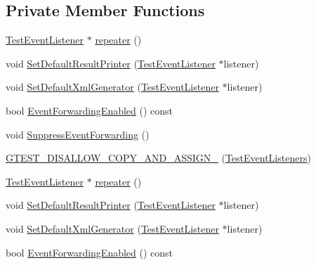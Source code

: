 \subsection*{Private Member Functions}
\begin{DoxyCompactItemize}
\item 
\mbox{\hyperlink{classtesting_1_1_test_event_listener}{Test\+Event\+Listener}} $\ast$ \mbox{\hyperlink{classtesting_1_1_test_event_listeners_ad28af964081553de465fbfc1c5a46650}{repeater}} ()
\item 
void \mbox{\hyperlink{classtesting_1_1_test_event_listeners_aeaab55da7c18c35fb12c27c18ff99955}{Set\+Default\+Result\+Printer}} (\mbox{\hyperlink{classtesting_1_1_test_event_listener}{Test\+Event\+Listener}} $\ast$listener)
\item 
void \mbox{\hyperlink{classtesting_1_1_test_event_listeners_a36dbac47563ef8bb78cb467d11f5b4d9}{Set\+Default\+Xml\+Generator}} (\mbox{\hyperlink{classtesting_1_1_test_event_listener}{Test\+Event\+Listener}} $\ast$listener)
\item 
bool \mbox{\hyperlink{classtesting_1_1_test_event_listeners_aa1878baf16a50f30f6435fad3c68ef3f}{Event\+Forwarding\+Enabled}} () const
\item 
void \mbox{\hyperlink{classtesting_1_1_test_event_listeners_a7132550dc1c50bb3399a6d6d3fc9be3d}{Suppress\+Event\+Forwarding}} ()
\item 
\mbox{\hyperlink{classtesting_1_1_test_event_listeners_a31d12292abc277dedbb7dc7748a6a60e}{G\+T\+E\+S\+T\+\_\+\+D\+I\+S\+A\+L\+L\+O\+W\+\_\+\+C\+O\+P\+Y\+\_\+\+A\+N\+D\+\_\+\+A\+S\+S\+I\+G\+N\+\_\+}} (\mbox{\hyperlink{classtesting_1_1_test_event_listeners}{Test\+Event\+Listeners}})
\item 
\mbox{\hyperlink{classtesting_1_1_test_event_listener}{Test\+Event\+Listener}} $\ast$ \mbox{\hyperlink{classtesting_1_1_test_event_listeners_a3de1e101514bdba3e74b93adc604e9c4}{repeater}} ()
\item 
void \mbox{\hyperlink{classtesting_1_1_test_event_listeners_aeaab55da7c18c35fb12c27c18ff99955}{Set\+Default\+Result\+Printer}} (\mbox{\hyperlink{classtesting_1_1_test_event_listener}{Test\+Event\+Listener}} $\ast$listener)
\item 
void \mbox{\hyperlink{classtesting_1_1_test_event_listeners_a36dbac47563ef8bb78cb467d11f5b4d9}{Set\+Default\+Xml\+Generator}} (\mbox{\hyperlink{classtesting_1_1_test_event_listener}{Test\+Event\+Listener}} $\ast$listener)
\item 
bool \mbox{\hyperlink{classtesting_1_1_test_event_listeners_aa1878baf16a50f30f6435fad3c68ef3f}{Event\+Forwarding\+Enabled}} () const

\end{DoxyCompactItemize}
